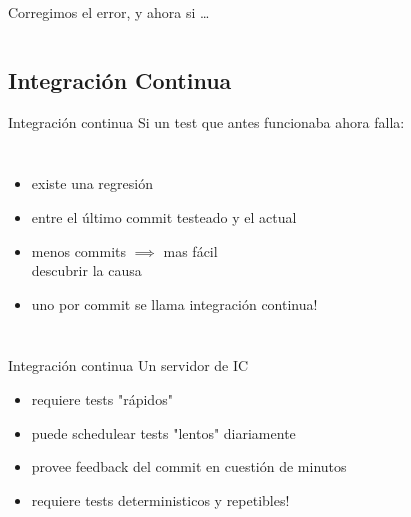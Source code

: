 \begin{frame}{Corregimos el error, y ahora si \ldots}
\begin{columns}[onlytextwidth]
	\begin{flushright}
	\end{flushright}
	
\end{columns}
\end{frame}

\subsection{Integraci\'on Continua}
\begin{frame}{Integraci\'on continua}
Si un test que antes funcionaba ahora falla:
\bigskip
\begin{columns}[onlytextwidth]
	\begin{itemize}
		\item existe una regresi\'on
		\item entre el \'ultimo commit testeado y el actual
		\item menos commits $\implies$ mas f\'acil \\
				descubrir la causa
		\item uno por commit se llama integraci\'on continua!
	\end{itemize}
\end{columns}

\end{frame}

\begin{frame}{Integraci\'on continua}
Un servidor de IC
\begin{itemize}
	\item requiere tests "r\'apidos"
	\item puede schedulear tests "lentos" diariamente
	\item provee feedback del commit en cuesti\'on de minutos
	\item \alert{requiere tests deterministicos y repetibles!}
\end{itemize}
\bigskip
\bigskip
{}
\end{frame}


